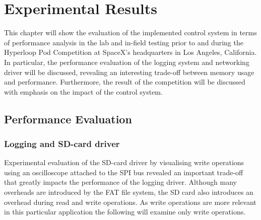

\chapter{Experimental Results}

This chapter will show the evaluation of the implemented control system in terms of performance analysis in the lab and in-field testing prior to and during the Hyperloop Pod Competition at SpaceX's headquarters in Los Angeles, California. In particular, the performance evaluation of the logging system and networking driver will be discussed, revealing an interesting trade-off between memory usage and performance. Furthermore, the result of the competition will be discussed with emphasis on the impact of the control system.

\section{Performance Evaluation}

\subsection{Logging and SD-card driver} \label{logging_perf}

Experimental evaluation of the SD-card driver by visualising write operations using an oscilloscope attached to the SPI bus revealed an important trade-off that greatly impacts the performance of the logging driver. Although many overheads are introduced by the FAT file system, the SD card also introduces an overhead during read and write operations. As write operations are more relevant in this particular application the following will examine only write operations.

